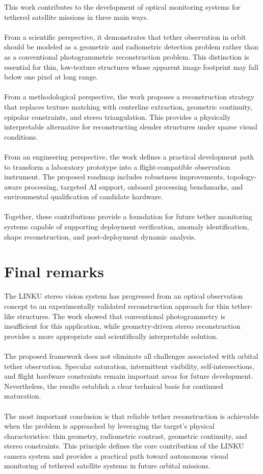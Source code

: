 This work contributes to the development of optical monitoring systems for tethered satellite missions in three main ways.
\\\\
From a scientific perspective, it demonstrates that tether observation in orbit should be modeled as a geometric and radiometric detection problem rather than as a conventional photogrammetric reconstruction problem. This distinction is essential for thin, low-texture structures whose apparent image footprint may fall below one pixel at long range.
\\\\
From a methodological perspective, the work proposes a reconstruction strategy that replaces texture matching with centerline extraction, geometric continuity, epipolar constraints, and stereo triangulation. This provides a physically interpretable alternative for reconstructing slender structures under sparse visual conditions.
\\\\
From an engineering perspective, the work defines a practical development path to transform a laboratory prototype into a flight-compatible observation instrument. The proposed roadmap includes robustness improvements, topology-aware processing, targeted AI support, onboard processing benchmarks, and environmental qualification of candidate hardware.
\\\\
Together, these contributions provide a foundation for future tether monitoring systems capable of supporting deployment verification, anomaly identification, shape reconstruction, and post-deployment dynamic analysis.

\section{Final remarks}

The LINKU stereo vision system has progressed from an optical observation concept to an experimentally validated reconstruction approach for thin tether-like structures. The work showed that conventional photogrammetry is insufficient for this application, while geometry-driven stereo reconstruction provides a more appropriate and scientifically interpretable solution.
\\\\
The proposed framework does not eliminate all challenges associated with orbital tether observation. Specular saturation, intermittent visibility, self-intersections, and flight hardware constraints remain important areas for future development. Nevertheless, the results establish a clear technical basis for continued maturation.
\\\\
The most important conclusion is that reliable tether reconstruction is achievable when the problem is approached by leveraging the target's physical characteristics: thin geometry, radiometric contrast, geometric continuity, and stereo constraints. This principle defines the core contribution of the LINKU camera system and provides a practical path toward autonomous visual monitoring of tethered satellite systems in future orbital missions.

